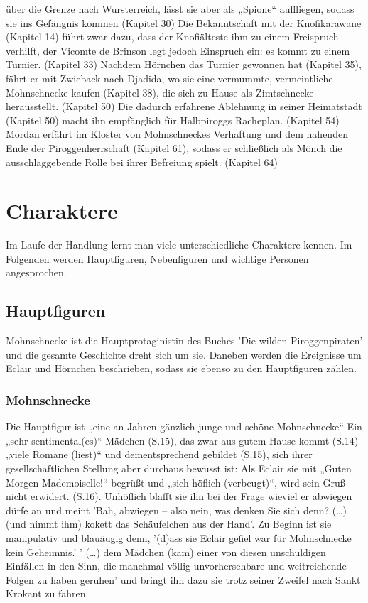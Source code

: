 über die Grenze nach Wursterreich, lässt sie aber als „Spione“ auffliegen, sodass sie ins Gefängnis kommen (Kapitel 30) 
Die Bekanntschaft mit der Knofikarawane (Kapitel 14) führt zwar dazu, dass der Knofiälteste ihm zu einem Freispruch 
verhilft, der Vicomte de Brinson legt jedoch Einspruch ein: es kommt zu einem Turnier. (Kapitel 33) 
Nachdem Hörnchen das Turnier gewonnen hat (Kapitel 35), fährt er mit Zwieback nach Djadida, wo sie eine vermummte, 
vermeintliche Mohnschnecke kaufen (Kapitel 38), die sich zu Hause als Zimtschnecke herausstellt. (Kapitel 50) 
Die dadurch erfahrene Ablehnung in seiner Heimatstadt (Kapitel 50) macht ihn empfänglich für Halbpiroggs 
Racheplan. (Kapitel 54) Mordan erfährt im Kloster von Mohnschneckes Verhaftung und dem nahenden Ende der 
Piroggenherrschaft (Kapitel 61), sodass er schließlich als Mönch die ausschlaggebende Rolle bei ihrer 
Befreiung spielt. (Kapitel 64)


\section{Charaktere}
Im Laufe der Handlung lernt man viele unterschiedliche Charaktere kennen. Im Folgenden werden Hauptfiguren,  Nebenfiguren und wichtige Personen angesprochen.

\subsection{Hauptfiguren}

Mohnschnecke ist die Hauptprotaginistin des Buches 'Die wilden Piroggenpiraten' und die gesamte Geschichte dreht sich um sie. Daneben werden die Ereignisse um Eclair und Hörnchen beschrieben, sodass sie ebenso zu den Hauptfiguren zählen.

\subsubsection{Mohnschnecke}

Die Hauptfigur ist „eine an Jahren gänzlich junge und schöne Mohnschnecke“ \cite[S.13]{pir}
Ein „sehr sentimental(es)“ Mädchen (S.15), das  zwar aus gutem Hause kommt (S.14) „viele Romane (liest)“ 
und dementsprechend gebildet (S.15), sich ihrer gesellschaftlichen Stellung aber durchaus bewusst ist: 
Als Eclair sie mit „Guten Morgen Mademoiselle!“ begrüßt und „sich höflich (verbeugt)“, wird sein Gruß nicht 
erwidert. (S.16). Unhöflich blafft sie ihn bei der Frage wieviel er abwiegen dürfe an
und meint 'Bah, abwiegen – also nein, was denken Sie sich denn? (…)(und nimmt ihm) kokett das Schäufelchen aus der Hand'. \cite[S.16]{pir}
Zu Beginn ist sie manipulativ und blauäugig denn, '(d)ass sie Eclair gefiel war für Mohnschnecke kein Geheimnis.'  \cite[S.17]{pir}
' (…) dem Mädchen (kam) einer von diesen unschuldigen Einfällen in den Sinn, die manchmal völlig unvorhersehbare und weitreichende Folgen zu haben geruhen' \cite[S. 19]{pir}
und bringt ihn dazu sie trotz seiner Zweifel nach Sankt Krokant zu fahren.  \cite[S. 19]{pir}


